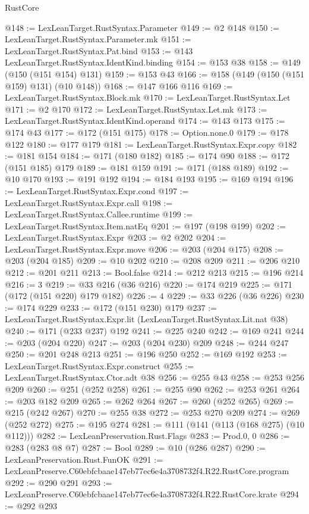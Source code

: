 \begin{lexlean}{RustCore}
\begin{coremodule}
@148 := LexLeanTarget.RustSyntax.Parameter
@149 := @2 @148
@150 := LexLeanTarget.RustSyntax.Parameter.mk
@151 := LexLeanTarget.RustSyntax.Pat.bind
@153 := @143 LexLeanTarget.RustSyntax.IdentKind.binding
@154 := @153 @38
@158 := @149 (@150 (@151 @154) @131)
@159 := @153 @43
@166 := @158 (@149 (@150 (@151 @159) @131) (@10 @148))
@168 := @147 @166 @116
@169 := LexLeanTarget.RustSyntax.Block.mk
@170 := LexLeanTarget.RustSyntax.Let
@171 := @2 @170
@172 := LexLeanTarget.RustSyntax.Let.mk
@173 := LexLeanTarget.RustSyntax.IdentKind.operand
@174 := @143 @173
@175 := @174 @43
@177 := @172 (@151 @175)
@178 := Option.none.{0}
@179 := @178 @122
@180 := @177 @179
@181 := LexLeanTarget.RustSyntax.Expr.copy
@182 := @181 @154
@184 := @171 (@180 @182)
@185 := @174 @90
@188 := @172 (@151 @185) @179
@189 := @181 @159
@191 := @171 (@188 @189)
@192 := @10 @170
@193 := @191 @192
@194 := @184 @193
@195 := @169 @194
@196 := LexLeanTarget.RustSyntax.Expr.cond
@197 := LexLeanTarget.RustSyntax.Expr.call
@198 := LexLeanTarget.RustSyntax.Callee.runtime
@199 := LexLeanTarget.RustSyntax.Item.natEq
@201 := @197 (@198 @199)
@202 := LexLeanTarget.RustSyntax.Expr
@203 := @2 @202
@204 := LexLeanTarget.RustSyntax.Expr.move
@206 := @203 (@204 @175)
@208 := @203 (@204 @185)
@209 := @10 @202
@210 := @208 @209
@211 := @206 @210
@212 := @201 @211
@213 := Bool.false
@214 := @212 @213
@215 := @196 @214
@216 := 3
@219 := @33 @216 (@36 @216)
@220 := @174 @219
@225 := @171 (@172 (@151 @220) @179 @182)
@226 := 4
@229 := @33 @226 (@36 @226)
@230 := @174 @229
@233 := @172 (@151 @230) @179
@237 := LexLeanTarget.RustSyntax.Expr.lit (LexLeanTarget.RustSyntax.Lit.nat @38)
@240 := @171 (@233 @237) @192
@241 := @225 @240
@242 := @169 @241
@244 := @203 (@204 @220)
@247 := @203 (@204 @230) @209
@248 := @244 @247
@250 := @201 @248 @213
@251 := @196 @250
@252 := @169 @192
@253 := LexLeanTarget.RustSyntax.Expr.construct
@255 := LexLeanTarget.RustSyntax.Ctor.adt @38
@256 := @255 @43
@258 := @253 @256 @209
@260 := @251 (@252 @258)
@261 := @255 @90
@262 := @253 @261
@264 := @203 @182 @209
@265 := @262 @264
@267 := @260 (@252 @265)
@269 := @215 (@242 @267)
@270 := @255 @38
@272 := @253 @270 @209
@274 := @269 (@252 @272)
@275 := @195 @274
@281 := @111 (@141 (@113 (@168 @275) (@10 @112)))
@282 := LexLeanPreservation.Rust.Flags
@283 := Prod.{0, 0}
@286 := @283 (@283 @8 @7)
@287 := Bool
@289 := @10 (@286 @287)
@290 := LexLeanPreservation.Rust.FunOK
@291 := LexLeanPreserve.C60ebfcbaae147eb77ec6e4a3708732f4.R22.RustCore.program
@292 := @290 @291
@293 := LexLeanPreserve.C60ebfcbaae147eb77ec6e4a3708732f4.R22.RustCore.krate
@294 := @292 @293

\end{coremodule}
\end{lexlean}
